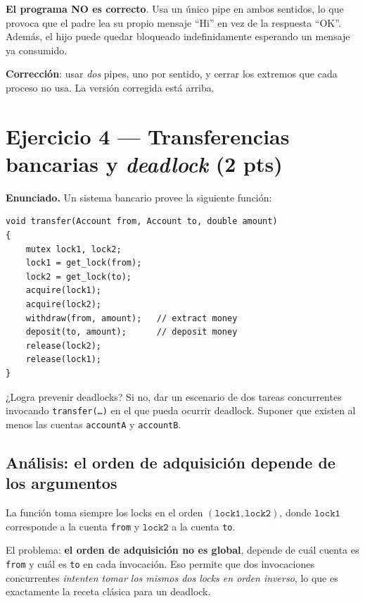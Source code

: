 \documentclass[11pt,a4paper]{article}
\begin{document}
\begin{respuesta}
\textbf{El programa NO es correcto}. Usa un único pipe en ambos
sentidos, lo que provoca que el padre lea su propio mensaje
``Hi'' en vez de la respuesta ``OK''. Además, el hijo puede quedar
bloqueado indefinidamente esperando un mensaje ya consumido.

\textbf{Corrección}: usar \emph{dos} pipes, uno por sentido, y cerrar
los extremos que cada proceso no usa. La versión corregida está
arriba.
\end{respuesta}

\section{Ejercicio 4 --- Transferencias bancarias y \emph{deadlock} (2 pts)}

\textbf{Enunciado.} Un sistema bancario provee la siguiente función:

\begin{lstlisting}[style=cstyle]
void transfer(Account from, Account to, double amount)
{
    mutex lock1, lock2;
    lock1 = get_lock(from);
    lock2 = get_lock(to);
    acquire(lock1);
    acquire(lock2);
    withdraw(from, amount);   // extract money
    deposit(to, amount);      // deposit money
    release(lock2);
    release(lock1);
}
\end{lstlisting}

¿Logra prevenir deadlocks? Si no, dar un escenario de dos tareas
concurrentes invocando \texttt{transfer(\ldots)} en el que pueda
ocurrir deadlock. Suponer que existen al menos las cuentas
\texttt{accountA} y \texttt{accountB}.

\subsection*{Análisis: el orden de adquisición depende de los argumentos}

La función toma siempre los locks en el orden $(\texttt{lock1},
\texttt{lock2})$, donde $\texttt{lock1}$ corresponde a la cuenta
\texttt{from} y $\texttt{lock2}$ a la cuenta \texttt{to}.

El problema: \textbf{el orden de adquisición no es global}, depende
de cuál cuenta es \texttt{from} y cuál es \texttt{to} en cada
invocación. Eso permite que dos invocaciones concurrentes
\emph{intenten tomar los mismos dos locks en orden inverso}, lo que
es exactamente la receta clásica para un deadlock.
\end{document}
